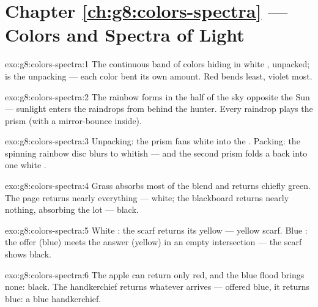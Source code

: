 \section*{Chapter \ref{ch:g8:colors-spectra} --- Colors and Spectra of Light}

\begin{solution}{exo:g8:colors-spectra:1}
The continuous band of colors hiding in white , unpacked;
 is the unpacking --- each color bent its own amount.
Red bends least, violet most.
\end{solution}

\begin{solution}{exo:g8:colors-spectra:2}
The rainbow forms in the half of the sky opposite the Sun ---
sunlight enters the raindrops from behind the hunter. Every
raindrop plays the prism (with a mirror-bounce inside).
\end{solution}

\begin{solution}{exo:g8:colors-spectra:3}
Unpacking: the prism fans white  into the .
Packing: the spinning rainbow disc blurs to whitish --- and the
second prism folds a  back into one white .
\end{solution}

\begin{solution}{exo:g8:colors-spectra:4}
Grass absorbs most of the blend and returns chiefly green. The
page returns nearly everything --- white; the blackboard
returns nearly nothing, absorbing the lot --- black.
\end{solution}

\begin{solution}{exo:g8:colors-spectra:5}
White : the scarf returns its yellow --- yellow scarf.
Blue : the offer (blue) meets the answer (yellow) in an
empty intersection --- the scarf shows black.
\end{solution}

\begin{solution}{exo:g8:colors-spectra:6}
The apple can return only red, and the blue flood brings none:
black. The handkerchief returns whatever arrives --- offered
blue, it returns blue: a blue handkerchief.
\end{solution}

